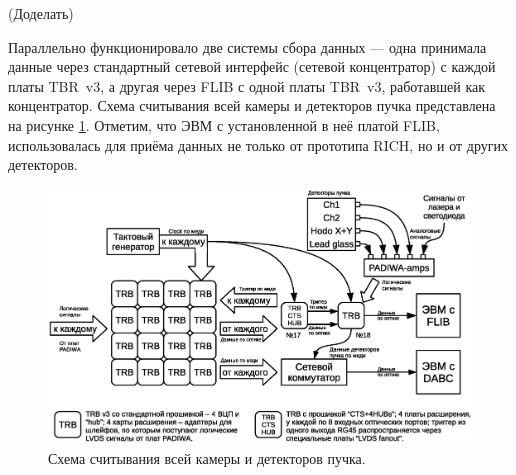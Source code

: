 (Доделать)

Параллельно функционировало две системы сбора данных --- одна принимала данные через стандартный сетевой интерфейс (сетевой концентратор) с каждой платы TBR~v3, а другая через FLIB с одной платы TBR~v3, работавшей как концентратор. Схема считывания всей камеры и детекторов пучка представлена на рисунке \ref{fig:BeamtimeReadout}. Отметим, что ЭВМ с установленной в неё платой FLIB, использовалась для приёма данных не только от прототипа RICH, но и от других детекторов.

\begin{figure}
\includegraphics[width=1.0\textwidth]{pictures/11_Beamtime_readout_chain.eps}
\caption{Схема считывания всей камеры и детекторов пучка.}
\label{fig:BeamtimeReadout}
\end{figure}
